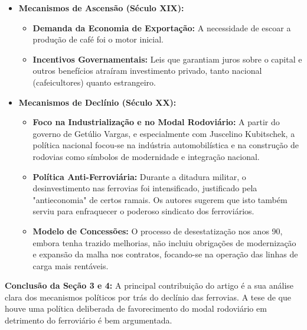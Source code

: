 \documentclass[12pt, a4paper]{article}
\begin{document}
\begin{itemize}
    \item \textbf{Mecanismos de Ascensão (Século XIX):}
        \begin{itemize}
            \item \textbf{Demanda da Economia de Exportação:} A necessidade de escoar a produção de café foi o motor inicial.
            \item \textbf{Incentivos Governamentais:} Leis que garantiam juros sobre o capital e outros benefícios atraíram investimento privado, tanto nacional (cafeicultores) quanto estrangeiro.
        \end{itemize}
    \item \textbf{Mecanismos de Declínio (Século XX):}
        \begin{itemize}
            \item \textbf{Foco na Industrialização e no Modal Rodoviário:} A partir do governo de Getúlio Vargas, e especialmente com Juscelino Kubitschek, a política nacional focou-se na indústria automobilística e na construção de rodovias como símbolos de modernidade e integração nacional.
            \item \textbf{Política Anti-Ferroviária:} Durante a ditadura militar, o desinvestimento nas ferrovias foi intensificado, justificado pela "antieconomia" de certos ramais. Os autores sugerem que isto também serviu para enfraquecer o poderoso sindicato dos ferroviários.
            \item \textbf{Modelo de Concessões:} O processo de desestatização nos anos 90, embora tenha trazido melhorias, não incluiu obrigações de modernização e expansão da malha nos contratos, focando-se na operação das linhas de carga mais rentáveis.
        \end{itemize}
\end{itemize}

\noindent\textbf{Conclusão da Seção 3 e 4:} A principal contribuição do artigo é a sua análise clara dos mecanismos políticos por trás do declínio das ferrovias. A tese de que houve uma política deliberada de favorecimento do modal rodoviário em detrimento do ferroviário é bem argumentada.
\end{document}
